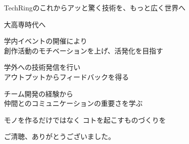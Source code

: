 \documentclass[dvipdfmx]{beamer}
\begin{document}
\begin{frame}{TechRingのこれから}{アッと驚く技術を、もっと広く世界へ}
  \begin{block}{大高専時代へ}
    \vspace{2mm}
    \begin{description}
      \setlength{\itemsep}{2mm}
      \item[創造の意欲] 学内イベントの開催により\\
      創作活動のモチベーションを上げ、活発化を目指す
      \item[幅広い視野] 学外への技術発信を行い\\
      アウトプットからフィードバックを得る
      \item[自立と友愛] チーム開発の経験から\\
      仲間とのコミュニケーションの重要さを学ぶ
    \end{description}
  \end{block}

  \vfill

  \begin{Large}
    モノを作るだけではなく \vfill \hspace{7em}\alert{コトを起こす}ものづくりを
  \end{Large}
\end{frame}

\begin{frame}
  \begin{center}
    \begin{Large}
      ご清聴、ありがとうございました。
    \end{Large}
  \end{center}
\end{frame}
\end{document}
